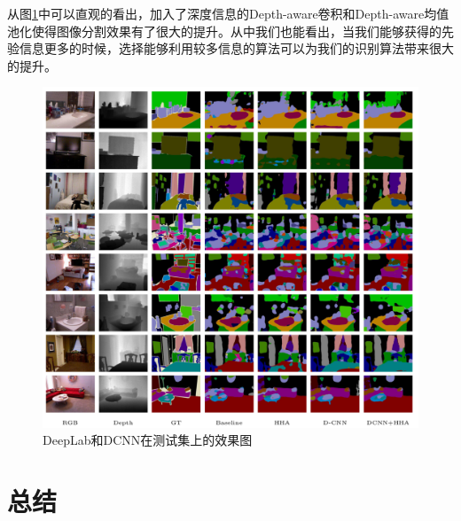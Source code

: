 \documentclass[cn]{elegantbook}
\begin{document}
从图\ref{res2}中可以直观的看出，加入了深度信息的Depth-aware卷积和Depth-aware均值池化使得图像分割效果有了很大的提升。从中我们也能看出，当我们能够获得的先验信息更多的时候，选择能够利用较多信息的算法可以为我们的识别算法带来很大的提升。
\begin{figure}[h]
	\centering
	\includegraphics[width=\textwidth]{images/res2.png}
	\caption{\label{res2}DeepLab和DCNN在测试集上的效果图}
\end{figure}

\section{}
\chapter{总结}





\end{document}
